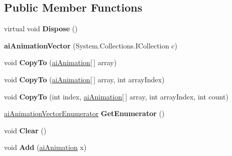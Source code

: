 \subsection*{Public Member Functions}
\begin{DoxyCompactItemize}
\item 
\hypertarget{classai_animation_vector_a5c2817e67973c878d8ff36ae302c1a3d}{virtual void {\bfseries Dispose} ()}\label{classai_animation_vector_a5c2817e67973c878d8ff36ae302c1a3d}

\item 
\hypertarget{classai_animation_vector_adad0d19744704fc9912044f2d54acd64}{{\bfseries ai\+Animation\+Vector} (System.\+Collections.\+I\+Collection c)}\label{classai_animation_vector_adad0d19744704fc9912044f2d54acd64}

\item 
\hypertarget{classai_animation_vector_a54a70c71901288efa43df5299b34a619}{void {\bfseries Copy\+To} (\hyperlink{structai_animation}{ai\+Animation}\mbox{[}$\,$\mbox{]} array)}\label{classai_animation_vector_a54a70c71901288efa43df5299b34a619}

\item 
\hypertarget{classai_animation_vector_adecccf50ae6929e746ef0812430f59e3}{void {\bfseries Copy\+To} (\hyperlink{structai_animation}{ai\+Animation}\mbox{[}$\,$\mbox{]} array, int array\+Index)}\label{classai_animation_vector_adecccf50ae6929e746ef0812430f59e3}

\item 
\hypertarget{classai_animation_vector_a7262b88ec2912aa30926f67b64ef9413}{void {\bfseries Copy\+To} (int index, \hyperlink{structai_animation}{ai\+Animation}\mbox{[}$\,$\mbox{]} array, int array\+Index, int count)}\label{classai_animation_vector_a7262b88ec2912aa30926f67b64ef9413}

\item 
\hypertarget{classai_animation_vector_a5f78fc8bcb22a17c467c474a4ba134b5}{\hyperlink{classai_animation_vector_1_1ai_animation_vector_enumerator}{ai\+Animation\+Vector\+Enumerator} {\bfseries Get\+Enumerator} ()}\label{classai_animation_vector_a5f78fc8bcb22a17c467c474a4ba134b5}

\item 
\hypertarget{classai_animation_vector_ab855410e822b3335b8afe4bc87fc57a2}{void {\bfseries Clear} ()}\label{classai_animation_vector_ab855410e822b3335b8afe4bc87fc57a2}

\item 
\hypertarget{classai_animation_vector_abfbe2ee39e68e22f6ef6d31243e706b6}{void {\bfseries Add} (\hyperlink{structai_animation}{ai\+Animation} x)}\label{classai_animation_vector_abfbe2ee39e68e22f6ef6d31243e706b6}


\end{DoxyCompactItemize}
